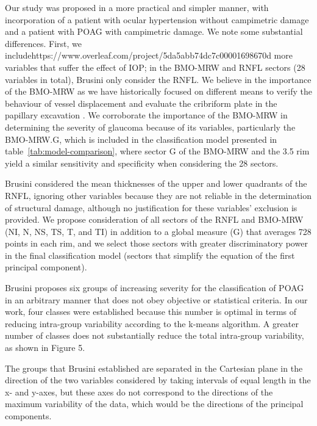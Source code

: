 \documentclass[fleqn,10pt]{wlscirep}
\begin{document}
Our study was proposed in a more practical and simpler manner, with incorporation of a patient with ocular hypertension without campimetric damage and a patient with POAG with campimetric damage. We note some substantial differences. First, we includehttps://www.overleaf.com/project/5da5abb74dc7c00001698670d more variables that suffer the effect of IOP; in the BMO-MRW and RNFL sectors (28 variables in total), Brusini only consider the RNFL. We believe in the importance of the BMO-MRW as we have historically focused on different means to verify the behaviour of vessel displacement and evaluate the cribriform plate in the papillary excavation \cite{reis:2012:influence}. We corroborate the importance of the BMO-MRW in determining the severity of glaucoma because of its variables, particularly the BMO-MRW.G, which is included in the classification model presented in table~\ref{tab:model-comparison}, where sector G of the BMO-MRW and the 3.5 rim yield a similar sensitivity and specificity when considering the 28 sectors.

Brusini considered the mean thicknesses of the upper and lower quadrants of the RNFL, ignoring other variables because they are not reliable in the determination of structural damage, although no justification for these variables’ exclusion is provided. We propose consideration of all sectors of the RNFL and BMO-MRW (NI, N, NS, TS, T, and TI) in addition to a global measure (G) that averages 728 points in each rim, and we select those sectors with greater discriminatory power in the final classification model (sectors that simplify the equation of the first principal component). 

Brusini proposes six groups of increasing severity for the classification of POAG in an arbitrary manner that does not obey objective or statistical criteria.  In our work, four classes were established because this number is optimal in terms of reducing intra-group variability according to the k-means algorithm. A greater number of classes does not substantially reduce the total intra-group variability, as shown in Figure 5.

The groups that Brusini established are separated in the Cartesian plane in the direction of the two variables considered by taking intervals of equal length in the x- and y-axes, but these axes do not correspond to the directions of the maximum variability of the data, which would be the directions of the principal components.  
\end{document}

